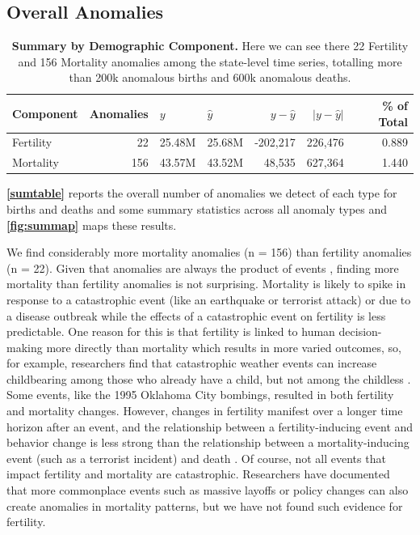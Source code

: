 \documentclass[12pt]{article}
\begin{document}
\hypertarget{overall-anomalies}{%
\subsection{Overall Anomalies}\label{overall-anomalies}}

\begin{table}

\caption{\label{tab:unnamed-chunk-6}\textbf{Summary by Demographic Component.}  Here we can see there 22 Fertility and 156 Mortality anomalies among the state-level time series, totalling more than 200k anomalous births and 600k anomalous deaths. \label{sumtable}}
\centering
\begin{tabular}[t]{lrllrrr}
\toprule
Component & Anomalies & $y$ & $\hat{y}$ & $y-\hat{y}$ & $|y-\hat{y}|$ & \% of Total\\
\midrule
Fertility & 22 & 25.48M & 25.68M & -202,217 & 226,476 & 0.889\\
Mortality & 156 & 43.57M & 43.52M & 48,535 & 627,364 & 1.440\\
\bottomrule
\end{tabular}
\end{table}

\textbf{\autoref{sumtable}} reports the overall number of anomalies we
detect of each type for births and deaths and some summary statistics
across all anomaly types and \textbf{\autoref{fig:summap}} maps these
results.

We find considerably more mortality anomalies (n = 156) than fertility
anomalies (n = 22). Given that anomalies are always the product of
events \citep{song2018anomaly}, finding more mortality than fertility
anomalies is not surprising. Mortality is likely to spike in response to
a catastrophic event (like an earthquake or terrorist attack) or due to
a disease outbreak while the effects of a catastrophic event on
fertility is less predictable. One reason for this is that fertility is
linked to human decision-making more directly than mortality
\citep{stein2014couples} which results in more varied outcomes, so, for
example, researchers find that catastrophic weather events can increase
childbearing among those who already have a child, but not among the
childless \citep{Evans2008Hurricanebirth}. Some events, like the 1995
Oklahoma City bombings, resulted in both fertility and mortality
changes. However, changes in fertility manifest over a longer time
horizon after an event, and the relationship between a
fertility-inducing event and behavior change is less strong than the
relationship between a mortality-inducing event (such as a terrorist
incident) and death \citep{Rodgers2005OKBombing}. Of course, not all
events that impact fertility and mortality are catastrophic. Researchers
have documented that more commonplace events such as massive layoffs
\citep{Venkataramani2019} or policy changes
\citep{Livingston2017Cannabis} can also create anomalies in mortality
patterns, but we have not found such evidence for fertility.
\end{document}
